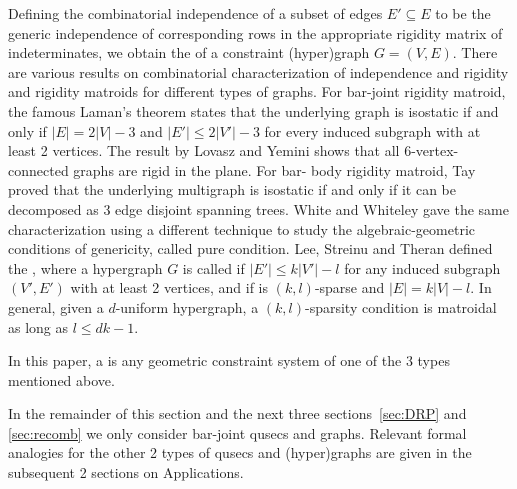 Defining the combinatorial independence of a subset of edges $E'
\subseteq E$ to be the generic independence of corresponding rows in
the appropriate rigidity matrix of indeterminates, we obtain the
 of a constraint (hyper)graph $G = (V,E)$.%
There are various results on combinatorial characterization of
independence and rigidity  and rigidity matroids for different types
of graphs. For bar-joint rigidity matroid, the famous Laman's theorem
\uncited states that the underlying graph is isostatic if and only if
$|E| = 2|V|-3$ and $|E'| \le 2|V'|-3$ for every induced subgraph with
at least 2 vertices. The result by Lovasz and Yemini \uncited  shows
that all 6-vertex-connected graphs are rigid in the plane. For bar-
body rigidity matroid, Tay \uncited proved that the underlying
multigraph is isostatic if and only if it can be decomposed as $3$
edge disjoint spanning trees. White and Whiteley \uncited gave the
same characterization using a different technique to study the
algebraic-geometric conditions of genericity, called pure condition.
Lee, Streinu and Theran \uncited defined the , where a hypergraph $G$ is called  if
$|E'| \le k|V'| - l$ for any induced subgraph $(V',E')$ with at least
2 vertices, and  if is $(k,l)$-sparse and $|E| =
k|V| - l$. In general, given a $d$-uniform hypergraph, a
$(k,l)$-sparsity condition is matroidal as long as $l \le dk-1$.



In this paper, a  is any  geometric
constraint system of one of the 3 types mentioned above.

\medskip\noindent
\note In the remainder of this section and the next three
sections~\ref{sec:DRP} and \ref{sec:recomb} we only consider bar-joint
qusecs and graphs. Relevant formal analogies for the other 2 types of
qusecs and (hyper)graphs are given in the subsequent 2 sections on
Applications.





